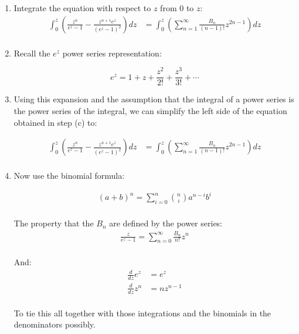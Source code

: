 \begin{enumerate}
\begin{enumerate}
      \item Integrate the equation with respect to $z$ from $0$ to $z$:
      \begin{align*}
        \int_{0}^{z} \left( \frac{z^n}{e^z - 1} - \frac{z^{n + 1} e^z}{(e^z - 1)^2} \right) dz &= \int_{0}^{z} \left( \sum_{n = 1}^{\infty}\frac{B_n}{(n-1)!}z^{2n-1} \right) dz \\
      \end{align*}

      \item Recall the $e^z$ power series representation:
    
      \[e^z = 1 + z + \frac{z^2}{2!} + \frac{z^3}{3!} + \cdots\]

      \item  Using this expansion and the assumption that the integral of a power series is the power series of the 
      integral, we can simplify the left side of the equation obtained in step (c) to:

      \begin{align*}
        \int_{0}^{z} \left( \frac{z^n}{e^z - 1} - \frac{z^{n + 1} e^z}{(e^z - 1)^2} \right) dz &= \int_{0}^{z} \left( \sum_{n = 1}^{\infty}\frac{B_n}{(n-1)!}z^{2n-1} \right) dz \\
      \end{align*}

      \item Now use the binomial formula:

      \begin{align*}
        (a + b)^n = \sum_{i = 0}^{n} {n \choose i} a^{n-i} b^i \\
      \end{align*}
      
      The property that the $B_n$ are defined 
      by the power series:
      \begin{align*}
        \frac{z}{e^z-1} = \sum_{n=0}^\infty \frac{B_n}{n!}z^n \\
      \end{align*}

      And:
      \begin{align*}
        \frac{d}{dz} e^z &= e^z \\
        \frac{d}{dz} z^n &= nz^{n-1} \\
      \end{align*}

      To tie this all together with those integrations and the binomials in the denominators possibly. 


\end{enumerate}
\end{enumerate}
